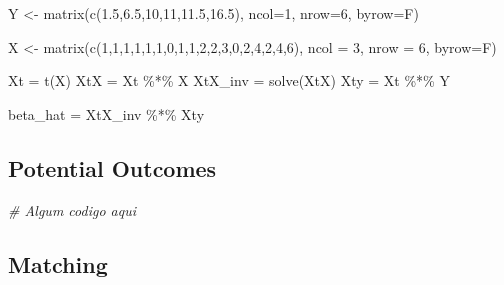 \documentclass[
]{article}
\newenvironment{Shaded}{\begin{snugshade}}{\end{snugshade}}
\newcommand{\AttributeTok}[1]{\textcolor[rgb]{0.77,0.63,0.00}{#1}}
\newcommand{\CommentTok}[1]{\textcolor[rgb]{0.56,0.35,0.01}{\textit{#1}}}
\newcommand{\DecValTok}[1]{\textcolor[rgb]{0.00,0.00,0.81}{#1}}
\newcommand{\FloatTok}[1]{\textcolor[rgb]{0.00,0.00,0.81}{#1}}
\newcommand{\FunctionTok}[1]{\textcolor[rgb]{0.00,0.00,0.00}{#1}}
\newcommand{\NormalTok}[1]{#1}
\newcommand{\OtherTok}[1]{\textcolor[rgb]{0.56,0.35,0.01}{#1}}
\newcommand{\SpecialCharTok}[1]{\textcolor[rgb]{0.00,0.00,0.00}{#1}}
\begin{document}
\begin{Shaded}
\begin{Highlighting}[]
\NormalTok{Y }\OtherTok{\textless{}{-}} \FunctionTok{matrix}\NormalTok{(}\FunctionTok{c}\NormalTok{(}\FloatTok{1.5}\NormalTok{,}\FloatTok{6.5}\NormalTok{,}\DecValTok{10}\NormalTok{,}\DecValTok{11}\NormalTok{,}\FloatTok{11.5}\NormalTok{,}\FloatTok{16.5}\NormalTok{), }\AttributeTok{ncol=}\DecValTok{1}\NormalTok{, }\AttributeTok{nrow=}\DecValTok{6}\NormalTok{, }\AttributeTok{byrow=}\NormalTok{F)}

\NormalTok{X }\OtherTok{\textless{}{-}} \FunctionTok{matrix}\NormalTok{(}\FunctionTok{c}\NormalTok{(}\DecValTok{1}\NormalTok{,}\DecValTok{1}\NormalTok{,}\DecValTok{1}\NormalTok{,}\DecValTok{1}\NormalTok{,}\DecValTok{1}\NormalTok{,}\DecValTok{1}\NormalTok{,}\DecValTok{0}\NormalTok{,}\DecValTok{1}\NormalTok{,}\DecValTok{1}\NormalTok{,}\DecValTok{2}\NormalTok{,}\DecValTok{2}\NormalTok{,}\DecValTok{3}\NormalTok{,}\DecValTok{0}\NormalTok{,}\DecValTok{2}\NormalTok{,}\DecValTok{4}\NormalTok{,}\DecValTok{2}\NormalTok{,}\DecValTok{4}\NormalTok{,}\DecValTok{6}\NormalTok{), }\AttributeTok{ncol =} \DecValTok{3}\NormalTok{, }\AttributeTok{nrow =} \DecValTok{6}\NormalTok{, }\AttributeTok{byrow=}\NormalTok{F)}

\NormalTok{Xt }\OtherTok{=} \FunctionTok{t}\NormalTok{(X)}
\NormalTok{XtX }\OtherTok{=}\NormalTok{ Xt }\SpecialCharTok{\%*\%}\NormalTok{ X}
\NormalTok{XtX\_inv }\OtherTok{=} \FunctionTok{solve}\NormalTok{(XtX)}
\NormalTok{Xty }\OtherTok{=}\NormalTok{ Xt }\SpecialCharTok{\%*\%}\NormalTok{ Y}

\NormalTok{beta\_hat }\OtherTok{=}\NormalTok{ XtX\_inv }\SpecialCharTok{\%*\%}\NormalTok{ Xty}
\end{Highlighting}
\end{Shaded}

\newpage

\hypertarget{potential-outcomes}{%
\subsection{Potential Outcomes}\label{potential-outcomes}}

\begin{Shaded}
\begin{Highlighting}[]
\CommentTok{\# Algum codigo aqui}
\end{Highlighting}
\end{Shaded}

\newpage

\hypertarget{matching}{%
\subsection{Matching}\label{matching}}
\end{document}
